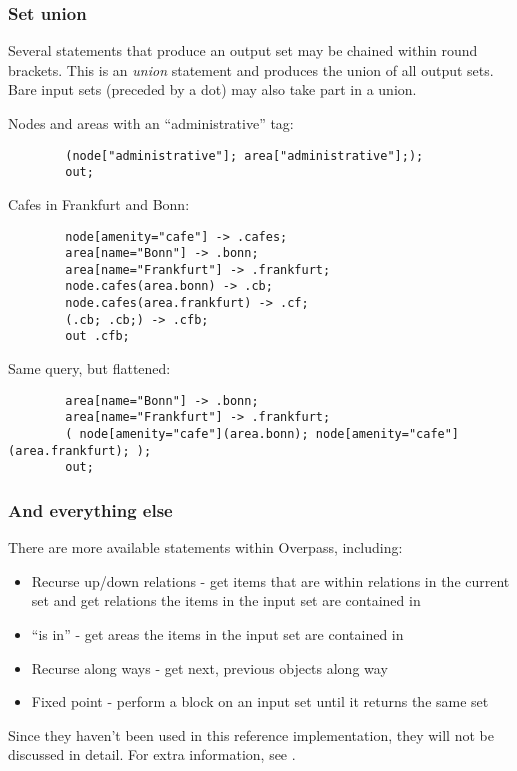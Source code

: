 \documentclass[main.tex]{subfiles}
\begin{document}
\subsubsection{Set union}
Several statements that produce an output set may be chained within round
brackets. This is an \emph{union} statement and produces the union of all
output sets. Bare input sets (preceded by a dot) may also take part in a union.

\begin{example}
    Nodes and areas with an ``administrative'' tag:
    \begin{lstwrap}\begin{lstlisting}
        (node["administrative"]; area["administrative"];);
        out;
    \end{lstlisting}\end{lstwrap}

    Cafes in Frankfurt and Bonn:
    \begin{lstwrap}\begin{lstlisting}
        node[amenity="cafe"] -> .cafes;
        area[name="Bonn"] -> .bonn;
        area[name="Frankfurt"] -> .frankfurt;
        node.cafes(area.bonn) -> .cb;
        node.cafes(area.frankfurt) -> .cf;
        (.cb; .cb;) -> .cfb;
        out .cfb;
    \end{lstlisting}\end{lstwrap}

    Same query, but flattened:
    \begin{lstwrap}\begin{lstlisting}
        area[name="Bonn"] -> .bonn;
        area[name="Frankfurt"] -> .frankfurt;
        ( node[amenity="cafe"](area.bonn); node[amenity="cafe"](area.frankfurt); );
        out;
    \end{lstlisting}\end{lstwrap}
\end{example}

\subsubsection{And everything else}
There are more available statements within Overpass, including:
\begin{itemize}
    \item Recurse up/down relations - get items that are within relations in the
        current set and get relations the items in the input set are contained
        in
    \item ``is in'' - get areas the items in the input set are contained in
    \item Recurse along ways - get next, previous objects along way
    \item Fixed point - perform a block on an input set until it returns the
        same set
\end{itemize}

Since they haven't been used in this reference implementation, they will not be
discussed in detail. For extra information, see \cite{overpassql}.
\end{document}
